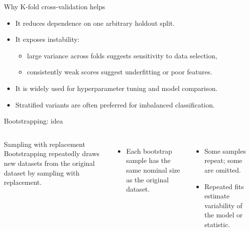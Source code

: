 \documentclass[12pt]{beamer}
\begin{document}
\begin{frame}{Why K-fold cross-validation helps}
  \begin{itemize}
    \item It reduces dependence on one arbitrary holdout split.
    \item It exposes instability:
      \begin{itemize}
        \item large variance across folds suggests sensitivity to data selection,
        \item consistently weak scores suggest underfitting or poor features.
      \end{itemize}
    \item It is widely used for hyperparameter tuning and model comparison.
    \item Stratified variants are often preferred for imbalanced classification.
  \end{itemize}
\end{frame}

\begin{frame}{Bootstrapping: idea}
  \begin{columns}[T]
      \begin{conceptbox}{Sampling with replacement}
        Bootstrapping repeatedly draws new datasets from the original dataset by sampling with replacement.
      \end{conceptbox}
      \begin{itemize}
        \item Each bootstrap sample has the same nominal size as the original dataset.
      \end{itemize}
      \centering
          \begin{itemize}
        \item Some samples repeat; some are omitted.
        \item Repeated fits estimate variability of the model or statistic.
      \end{itemize}
  \end{columns}
\end{frame}
\end{document}
